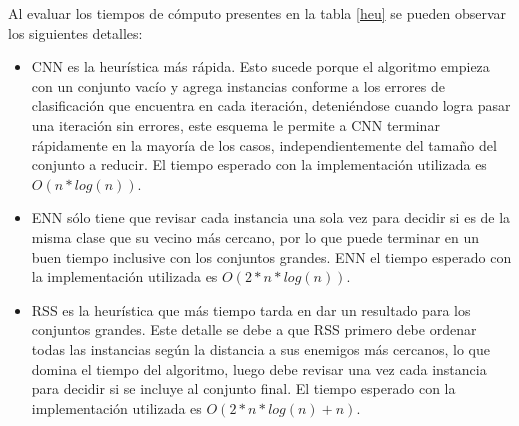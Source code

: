 Al evaluar los tiempos de cómputo presentes en la tabla \ref{heu} se pueden observar los siguientes detalles:

\begin{itemize}


\item CNN es la heurística más rápida. Esto sucede porque el algoritmo empieza con un conjunto vacío y agrega instancias conforme a los errores de clasificación que encuentra en cada iteración, deteniéndose cuando logra pasar una iteración sin errores, este esquema le permite a CNN terminar rápidamente en la mayoría de los casos, independientemente del tamaño del conjunto a reducir. El tiempo esperado con la implementación utilizada es $O(n*log(n))$.



\item ENN sólo tiene que revisar cada instancia una sola vez para decidir si es de la misma clase que su vecino más cercano, por lo que puede terminar en un buen tiempo inclusive con los conjuntos grandes. ENN el tiempo esperado con la implementación utilizada es $O(2*n*log(n))$.  

\item RSS es la heurística que más tiempo tarda en dar un resultado para los conjuntos grandes. Este detalle se debe a que RSS primero debe ordenar todas las instancias según la distancia a sus enemigos más cercanos, lo que domina el tiempo del algoritmo, luego debe revisar una vez cada instancia para decidir si se incluye al conjunto final. El tiempo esperado con la implementación utilizada es  $O(2*n*log(n) + n)$. 

\end{itemize}

